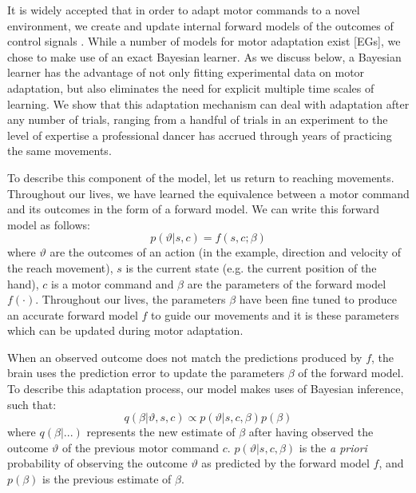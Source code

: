 \documentclass[a4paper,doc,floatsintext,natbib]{apa6}
\begin{document}
It is widely accepted that in order to adapt motor commands to a novel environment, we create and update internal forward models of the outcomes of control signals \cite{Wolpert_Multiple_1998a} . While a number of models for motor adaptation exist [EGs], we chose to make use of an exact Bayesian learner. As we discuss below, a Bayesian learner has the advantage of not only fitting experimental data on motor adaptation, but also eliminates the need for explicit multiple time scales of learning. We show that this adaptation mechanism can deal with adaptation after any number of trials, ranging from a handful of trials in an experiment to the level of expertise a professional dancer has accrued through years of practicing the same movements.

To describe this component of the model, let us return to reaching movements. Throughout our lives, we have learned the equivalence between a motor command and its outcomes in the form of a forward model. We can write this forward model as follows:
\begin{equation}
p(\vartheta | s, c) = f(s, c; \beta)
\end{equation}
where $\vartheta$ are the outcomes of an action (in the example, direction and velocity of the reach movement), $s$ is the current state (e.g. the current position of the hand), $c$ is a motor command and $\beta$ are the parameters of the forward model $f(\cdot)$. Throughout our lives, the parameters $\beta$ have been fine tuned to produce an accurate forward model $f$ to guide our movements and it is these parameters which can be updated during motor adaptation.

When an observed outcome does not match the predictions produced by $f$, the brain uses the prediction error to update the parameters $\beta$ of the forward model. To describe this adaptation process, our model makes uses of Bayesian inference, such that:
\begin{equation}
q(\beta | \vartheta, s, c) \propto p(\vartheta | s, c, \beta)p(\beta)
\end{equation}
where $q(\beta | ...)$ represents the new estimate of $\beta$ after having observed the outcome $\vartheta$ of the previous motor command $c$. $p(\vartheta | s, c, \beta)$ is the \textit{a priori} probability of observing the outcome $\vartheta$ as predicted by the forward model $f$, and $p(\beta)$ is the previous estimate of $\beta$.
\end{document}
